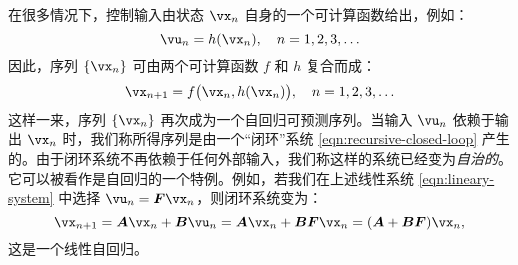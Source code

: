 \documentclass[../../book-main.tex]{subfiles}
\begin{document}
在很多情况下，控制输入由状态 $\vx_n$ 自身的一个可计算函数给出，例如：
\begin{equation}
    \vu_n = h(\vx_n), \quad n =  1, 2, 3, \ldots 
\end{equation}
因此，序列 $\{\vx_n\}$ 可由两个可计算函数 $f$ 和 $h$ 复合而成：
\begin{equation}
    \vx_{n+1} = f\big(\vx_{n}, h(\vx_n)\big), \quad n =  1, 2, 3, \ldots
    \label{eqn:recursive-closed-loop}
\end{equation}
这样一来，序列 $\{\vx_n\}$ 再次成为一个自回归可预测序列。当输入 $\vu_n$ 依赖于输出 $\vx_n$ 时，我们称所得序列是由一个“闭环”系统 \eqref{eqn:recursive-closed-loop} 产生的。由于闭环系统不再依赖于任何外部输入，我们称这样的系统已经变为{\em 自治的}。它可以被看作是自回归的一个特例。例如，若我们在上述线性系统 \eqref{eqn:lineary-system} 中选择 $\vu_n = \boldsymbol{F}\vx_n$，则闭环系统变为：
\begin{equation}
        \vx_{n+1} = \boldsymbol{A}\vx_n + \boldsymbol{B}\vu_n = \boldsymbol{A}\vx_n + \boldsymbol{B}\boldsymbol{F}\vx_n = (\boldsymbol{A}+ \boldsymbol{B}\boldsymbol{F})\vx_n,
    \label{eqn:lineary-system-closed}
\end{equation}
这是一个线性自回归。

\end{document}
